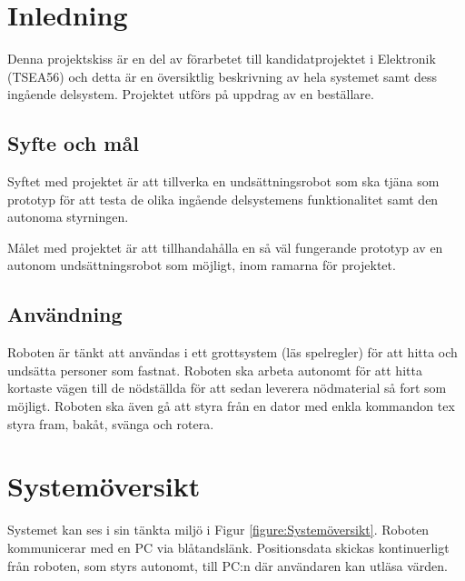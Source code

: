 \documentclass[11pt]{article}
\begin{document}
\pagebreak


\begin{flushleft}

\section{Inledning}
Denna projektskiss är en del av förarbetet till kandidatprojektet i Elektronik (TSEA56) och detta är en översiktlig beskrivning av hela systemet samt dess ingående delsystem. Projektet utförs på uppdrag av en beställare. 

\subsection{Syfte och mål}
Syftet med projektet är att tillverka en undsättningsrobot som ska tjäna som prototyp för att testa de olika ingående delsystemens funktionalitet samt den autonoma styrningen. 

Målet med projektet är att tillhandahålla en så väl fungerande prototyp av en autonom undsättningsrobot som möjligt, inom ramarna för projektet.


\subsection{Användning}
Roboten är tänkt att användas i ett grottsystem (läs spelregler) för att hitta och undsätta personer som fastnat. Roboten ska arbeta autonomt för att hitta kortaste vägen till de nödställda för att sedan leverera nödmaterial så fort som möjligt. Roboten ska även gå att styra från en dator med enkla kommandon tex styra fram, bakåt, svänga och rotera.



\section{Systemöversikt}
Systemet kan ses i sin tänkta miljö i Figur  \ref{figure:Systemöversikt}.
Roboten kommunicerar med en PC via blåtandslänk. Positionsdata skickas kontinuerligt från roboten, som styrs autonomt, till PC:n där användaren kan utläsa värden.


\end{flushleft}
\end{document}
